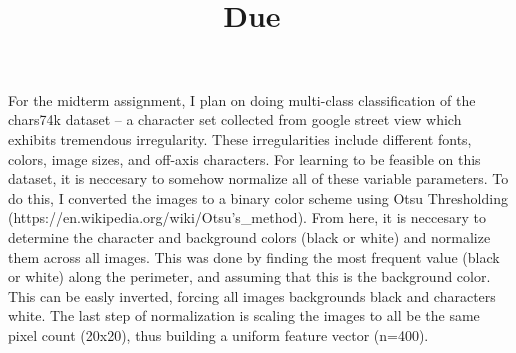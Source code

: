 \documentclass{article}
\title{
    \vspace{2in}
    \textmd{\textbf{\hmwkClass}}\\
    \textmd{\textbf{\hmwkTitle}}\\
    \normalsize\vspace{0.1in}\small{Due\ \hmwkDueDate}\\
    \vspace{3in}
}
\author{\textbf{\hmwkAuthorName}}
\date{}
\begin{document}
\maketitle

\pagebreak

For the midterm assignment, I plan on doing multi-class classification of the chars74k dataset -- a character set collected from google street view which exhibits tremendous irregularity.
These irregularities include different fonts, colors, image sizes, and off-axis characters. For learning to be feasible on this dataset, it is neccesary to somehow normalize
all of these variable parameters. To do this, I converted the images to a binary color scheme using Otsu Thresholding (https://en.wikipedia.org/wiki/Otsu's\_method). From here,
it is neccesary to determine the character and background colors (black or white) and normalize them across all images. This was done by finding the most frequent value
(black or white) along the perimeter, and assuming that this is the background color. This can be easly inverted, forcing all images backgrounds black and characters white.
The last step of normalization is scaling the images to all be the same pixel count (20x20), thus building a uniform feature vector (n=400).\\
\end{document}
